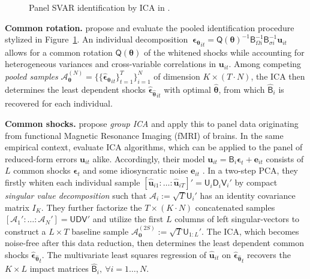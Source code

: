 \begin{figure}[ht]	%
	\centering
	\caption{Panel SVAR identification by ICA in \citet{Herwartz2017}.}
	\resizebox{0.75\textwidth}{!}{
		}
	\label{fig:PSVAR}
\end{figure}


\textbf{Common rotation.} \citet{Herwartz2017} propose and evaluate the pooled identification procedure stylized in Figure~\ref{fig:PSVAR}. An individual decomposition $ \ \boldsymbol{\epsilon_\theta}_{it} = \mathsf{Q} \left( \boldsymbol{\theta} \right)^{-1} \textsf{B}_{\Omega i}^{-1} \mathsf{B}_{\sigma i}^{-1} \boldsymbol{u}_{it} $ allows for a common rotation $ \mathsf{Q} \left( \boldsymbol{\theta} \right) $ of the whitened shocks while accounting for heterogeneous variances and cross-variable correlations in $ \boldsymbol{u}_{it} $. Among competing \textit{pooled samples} $ \mathcal{A}_{\boldsymbol{\theta}}^{(N)} = \{ \{ \boldsymbol{\widehat{\epsilon}_\theta}_{it} \}^T_{t=1} \}^N_{i=1} $ of dimension $ K \times (T \cdot N) $, the ICA then determines the least dependent shocks $ \boldsymbol{\widehat{\epsilon}_{\widehat{\theta}}}_{it} $ with optimal $ \boldsymbol{\widehat{\theta}} $, from which $ \widehat{\mathsf{B}}_i $ is recovered for each individual.


\textbf{Common shocks.} \citet{CalhounEtAl2002} propose \textit{group ICA} and apply this to panel data originating from functional Magnetic Resonance Imaging (fMRI) of brains. In the same empirical context, \citet{RiskEtAl2014} evaluate ICA algorithms, which can be applied to the panel of reduced-form errors $ \boldsymbol{u}_{it} $ alike. Accordingly, their model $ \boldsymbol{u}_{it} = \mathsf{B}_i \boldsymbol{\epsilon}_{t} + \boldsymbol{e}_{it} $ consists of $ L $ common shocks $ \boldsymbol{\epsilon}_{t} $ and some idiosyncratic noise $ \boldsymbol{e}_{it} $ \citep[p.~227]{RiskEtAl2014}. In a two-step PCA, they firstly whiten each individual sample $ \left[\boldsymbol{\widehat{u}}_{i1}: \ldots: \boldsymbol{\widehat{u}}_{iT} \right]' = \mathsf{U}_i^{\ } \mathsf{D}_i^{\ } \mathsf{V}_i' $ by compact \textit{singular value decomposition} such that $ \mathcal{A}_i := \sqrt{T} \mathsf{U}_i' $ has an identity covariance matrix $ I_K $. They further factorize the $ T \times (K \cdot N) $ concatenated samples $ \left[ \mathcal{A}_1' : \ldots : \mathcal{A}_N' \right] = \mathsf{U} \mathsf{D} \mathsf{V}' $ and utilize the first $ L $ columns of left singular-vectors to construct a $ L \times T $ baseline sample $ \mathcal{A}_{\boldsymbol{0}}^{(2S)} := \sqrt{T} \mathsf{U}_{1:L}' $. The ICA, which becomes noise-free after this data reduction, then determines the least dependent common shocks $ \boldsymbol{\widehat{\epsilon}_{\widehat{\theta}}}_t $. The multivariate least squares regression of $ \boldsymbol{\widehat{u}}_{it} $ on $ \boldsymbol{\widehat{\epsilon}_{\widehat{\theta}}}_t $ recovers the $ K \times L $ impact matrices $ \mathsf{\widehat{B}}_i, \ \forall i=1\ldots,N $.


